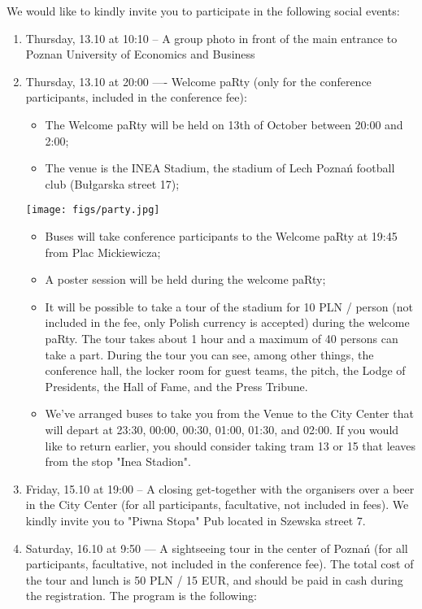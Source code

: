 We would like to kindly invite you to participate in the following social events:

\begin{enumerate}
        \item Thursday, 13.10 at 10:10 -- A group photo in front of the main entrance to Poznan University of Economics and Business
        \item Thursday, 13.10 at 20:00 —- Welcome paRty (only for the conference participants, included in the conference fee):
        
        \begin{itemize}
                \item The Welcome paRty will be held on 13th of October between 20:00 and 2:00;
                \item The venue is the INEA Stadium, the stadium of Lech Poznań football club (Bułgarska street 17);
        \end{itemize}
        
\begin{center}
\texttt{[image: figs/party.jpg]}
\end{center}

        \begin{itemize}
                \item Buses will take conference participants to the Welcome paRty at 19:45 from Plac Mickiewicza;
                \item A poster session will be held during the welcome paRty;
                \item It will be possible to take a tour of the stadium for 10 PLN / person (not included in the fee, only Polish currency is accepted) during the welcome paRty. The tour takes about 1 hour and a maximum of 40 persons can take a part. During the tour you can see, among other things, the conference hall, the locker room for guest teams, the pitch, the Lodge of Presidents, the Hall of Fame, and the Press Tribune.
                \item We've arranged buses to take you from the Venue to the City Center that will depart at 23:30, 00:00, 00:30, 01:00, 01:30, and 02:00. If you would like to return earlier, you should consider taking tram 13 or 15 that leaves from the stop "Inea Stadion". 
        \end{itemize}
        
        \item Friday, 15.10 at 19:00 -- A closing get-together with the organisers over a beer in the City Center (for all participants, facultative, not included in fees). We kindly invite you to "Piwna Stopa" Pub located in Szewska street 7.
        \item Saturday, 16.10 at 9:50 — A sightseeing tour in the center of Poznań (for all participants, facultative, not included in the conference fee). The total cost of the tour and lunch is 50 PLN / 15 EUR, and should be paid in cash during the registration. The program is the following:
        

\end{enumerate}
